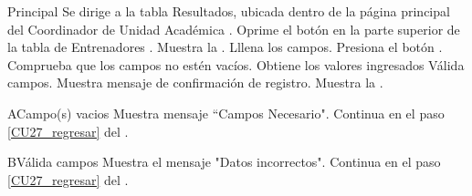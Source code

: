     \begin{UCtrayectoria}{Principal}
    \UCpaso[\UCactor] Se dirige a la tabla Resultados, ubicada dentro de la página principal del Coordinador de Unidad Académica .
    \UCpaso[\UCactor] Oprime el botón  en la parte superior de la tabla de Entrenadores .
    \UCpaso Muestra la . 
    \UCpaso[\UCactor] Lllena los campos. \label{CU27_regresar}  
    \UCpaso[\UCactor] Presiona el botón .
    \UCpaso Comprueba que los campos no estén vacíos. 
    \UCpaso Obtiene los valores ingresados
    \UCpaso Válida campos. 
    \UCpaso Muestra mensaje de confirmación de registro.
    \UCpaso Muestra la .
\end{UCtrayectoria}

\begin{UCtrayectoriaA}{A}{Campo(s) vacios}
	\UCpaso Muestra mensaje “Campos Necesario".
	\UCpaso Continua en el paso \ref{CU27_regresar} del .
\end{UCtrayectoriaA}

\begin{UCtrayectoriaA}{B}{Válida campos}
	\UCpaso Muestra el mensaje "Datos incorrectos".
	\UCpaso Continua en el paso \ref{CU27_regresar} del .
\end{UCtrayectoriaA}


	


